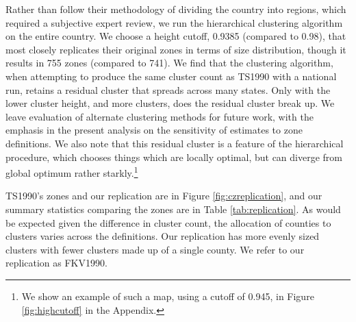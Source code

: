 Rather than follow their methodology of dividing the country into regions, which required a subjective expert review, we run the hierarchical clustering algorithm on the entire country. We choose a height cutoff, 0.9385 (compared to 0.98), that most closely replicates their original zones in terms of size distribution, though it results in 755 zones (compared to 741). We find that the clustering algorithm, when attempting to produce the same cluster count as TS1990 with a national run, retains a residual cluster that spreads across many states. Only with the lower cluster height, and more clusters, does the residual cluster break up. We leave evaluation of alternate clustering methods for future work, with the emphasis in the present analysis on the sensitivity of estimates to zone definitions. We also note that this residual cluster is a feature of the hierarchical procedure, which chooses things which are locally optimal, but can diverge from global optimum rather starkly.\footnote{We show an example of such a map, using a cutoff of 0.945, in Figure \ref{fig:highcutoff} in the Appendix.}

TS1990's zones and our replication are in Figure \ref{fig:czreplication}, and our summary statistics comparing the zones are in Table \ref{tab:replication}. As would be expected given the difference in cluster count, the allocation of counties to clusters varies across the definitions. Our replication has more evenly sized clusters with fewer clusters made up of a single county. We refer to our replication as FKV1990.
 
